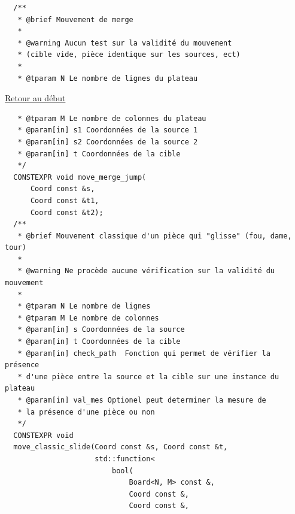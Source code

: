 {\begin{frame}[fragile]
\begin{verbatim}
  /**
   * @brief Mouvement de merge
   *
   * @warning Aucun test sur la validité du mouvement
   * (cible vide, pièce identique sur les sources, ect)
   *
   * @tparam N Le nombre de lignes du plateau
\end{verbatim}
\end{frame}

\begin{frame}[fragile]
\hyperlink{conclusion}{Retour au début}\newline
\begin{verbatim}
   * @tparam M Le nombre de colonnes du plateau
   * @param[in] s1 Coordonnées de la source 1
   * @param[in] s2 Coordonnées de la source 2
   * @param[in] t Coordonnées de la cible
   */
  CONSTEXPR void move_merge_jump(
      Coord const &s,
      Coord const &t1,
      Coord const &t2);
  /**
   * @brief Mouvement classique d'un pièce qui "glisse" (fou, dame, tour)
   *
   * @warning Ne procède aucune vérification sur la validité du mouvement
   *
   * @tparam N Le nombre de lignes
   * @tparam M Le nombre de colonnes
   * @param[in] s Coordonnées de la source
   * @param[in] t Coordonnées de la cible
   * @param[in] check_path  Fonction qui permet de vérifier la présence
   * d'une pièce entre la source et la cible sur une instance du plateau
   * @param[in] val_mes Optionel peut determiner la mesure de
   * la présence d'une pièce ou non
   */
  CONSTEXPR void
  move_classic_slide(Coord const &s, Coord const &t,
                     std::function<
                         bool(
                             Board<N, M> const &,
                             Coord const &,
                             Coord const &,
\end{verbatim}
\end{frame}

}
